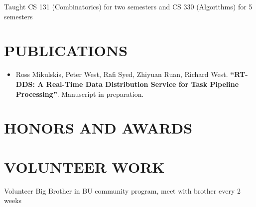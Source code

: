 \documentclass[10pt]{article}
\begin{document}
\begin{FlushLeft}
  \begin{itemize}{
    \item Taught CS 131 (Combinatorics) for two semesters and CS 330 (Algorithms) for 5 semesters
    }
  \end{itemize}

  
  \section{PUBLICATIONS}
  \begin{itemize}
  \item Ross Mikulskis, Peter West, Rafi Syed, Zhiyuan Ruan, Richard West. \textbf{``RT-DDS: A Real-Time Data Distribution Service for Task Pipeline Processing''}.
Manuscript in preparation.    
  \end{itemize}
  
  \section{HONORS AND AWARDS}
  \vspace{-0.75em}
  \begin{itemize}{
    \item {}
    \item {}
    \item {}
    \item {}      
    }
  \end{itemize}
  \section{VOLUNTEER WORK}

  \begin{itemize}{
    \item Volunteer Big Brother in BU community program, meet with brother every 2 weeks
    }
  \end{itemize}


\end{FlushLeft}
\end{document}
